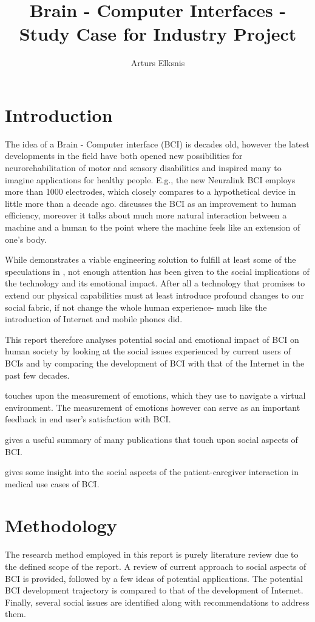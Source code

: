 \documentclass[fleqn,11pt]{olplainarticle}
\title{Brain - Computer Interfaces - Study Case for Industry Project}
\author[1]{Arturs Elksnis}
\begin{document}
\flushbottom
\maketitle
\thispagestyle{empty}

\section*{Introduction}
The idea of a Brain - Computer interface (BCI) is decades old, however the latest developments in the field have both opened new possibilities for neurorehabilitation of motor and sensory disabilities and inspired many to imagine applications for healthy people. E.g., the new Neuralink BCI \cite{musk2019integrated} employs more than 1000 electrodes, which closely compares to a hypothetical device in \cite{schalk2008brain} little more than a decade ago. \cite{schalk2008brain} discusses the BCI as an improvement to human efficiency, moreover it talks about much more natural interaction between a machine and a human to the point where the machine feels like an extension of one's body.

While \cite{musk2019integrated} demonstrates a viable engineering solution to fulfill at least some of the speculations in \cite{schalk2008brain}, not enough attention has been given to the social implications of the technology and its emotional impact. After all a technology that promises to extend our physical capabilities must at least introduce profound changes to our social fabric, if not change the whole human experience- much like the introduction of Internet and mobile phones did.

This report therefore analyses potential social and emotional impact of BCI on human society by looking at the social issues experienced by current users of BCIs and by comparing the development of BCI with that of the Internet in the past few decades.

\cite{luz2017enrichment} touches upon the measurement of emotions, which they use to navigate a virtual environment. The measurement of emotions however can serve as an important feedback in end user's satisfaction with BCI.

\cite{kogel2019using} gives a useful summary of many publications that touch upon social aspects of BCI.

gives some insight into the social aspects of the patient-caregiver interaction in medical use cases of BCI.

\section*{Methodology}
The research method employed in this report is purely literature review due to the defined scope of the report. A review of current approach to social aspects of BCI is provided, followed by a few ideas of potential applications. The potential BCI development trajectory is compared to that of the development of Internet. Finally, several social issues are identified along with recommendations to address them.
\end{document}
